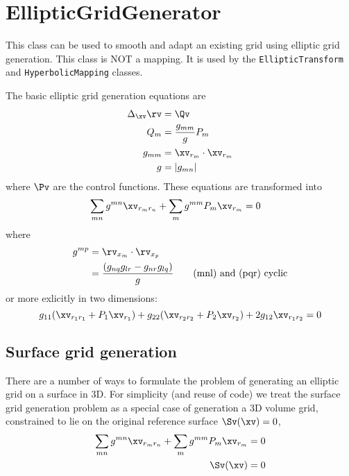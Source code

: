 
\section{EllipticGridGenerator}


This class can be used to smooth and adapt an existing grid using elliptic
grid generation. This class is NOT a mapping. It is used by the {\tt EllipticTransform}
and {\tt HyperbolicMapping} classes.



The basic elliptic grid generation equations are
\begin{align*}
  \Delta_{\xv} \rv & = \Qv    \\
      Q_m  & = { g_{mm} \over g } P_m \\
    g_{mm} & = \xv_{r_m}\cdot\xv_{r_m} \\
    g &= | g_{mn} |
\end{align*}
where $\Pv$ are the control functions. These equations are transformed into
\begin{align*}
   \sum_{mn}  g^{mn} \xv_{r_m r_n} + \sum_m g^{mm} P_m \xv_{r_m} &= 0 
\end{align*}
where
\begin{align*}
  g^{mp} & = \rv_{x_m}\cdot\rv_{x_p} \\
         & = {( g_{nq} g_{lr} - g_{nr} g_{lq} ) \over g}  \qquad\mbox{(mnl) and (pqr) cyclic}
\end{align*}
or more exlicitly in two dimensions:
\begin{equation}
 g_{11} (\xv_{r_1 r_1} + P_1 \xv_{r_1}) +g_{22} (\xv_{r_2 r_2} + P_2 \xv_{r_2}) + 2 g_{12} \xv_{r_1 r_2}=0
        \label{eq:ell1}
\end{equation}

\subsection{Surface grid generation}

  There are a number of ways to formulate the problem of generating an elliptic grid on a surface in 3D.
For simplicity (and reuse of code) we treat the surface grid generation problem as a special case
of generation a 3D volume grid, constrained to lie on the original reference surface $\Sv(\xv)=0$,
\begin{align*}
   \sum_{mn}  g^{mn} \xv_{r_m r_n} + \sum_m g^{mm} P_m \xv_{r_m} &= 0  \\
    \Sv(\xv) &=0 
\end{align*}

